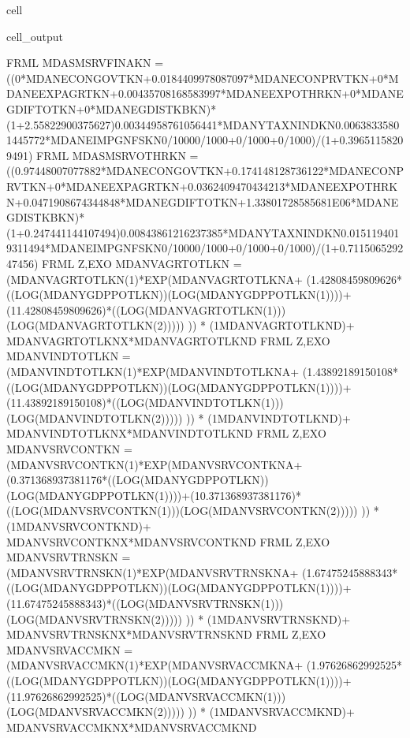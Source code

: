 \documentclass[letterpaper,10pt,english]{jupyterBook}
\begin{document}
\begin{sphinxuseclass}{cell}
\begin{sphinxVerbatimOutput}
\begin{sphinxuseclass}{cell_output}
\begin{sphinxVerbatim}[commandchars=\\\{\}]
FRML  \PYGZlt{}\PYGZgt{} MDASMSRVFINAKN = ((0*MDANECONGOVTKN+0.0184409978087097*MDANECONPRVTKN+0*MDANEEXPAGRTKN+0.00435708168583997*MDANEEXPOTHRKN+0*MDANEGDIFTOTKN+0*MDANEGDISTKBKN)*(1+2.55822900375627)\PYGZhy{}0.00344958761056441*MDANYTAXNINDKN\PYGZhy{}0.00638335801445772*MDANEIMPGNFSKN\PYGZhy{}0/1000\PYGZhy{}0/1000+0/1000+0/1000)/(1+0.39651158209491) \PYGZdl{}
FRML  \PYGZlt{}\PYGZgt{} MDASMSRVOTHRKN = ((0.97448007077882*MDANECONGOVTKN+0.174148128736122*MDANECONPRVTKN+0*MDANEEXPAGRTKN+0.0362409470434213*MDANEEXPOTHRKN+0.0471908674344848*MDANEGDIFTOTKN+1.33801728585681E\PYGZhy{}06*MDANEGDISTKBKN)*(1+0.247441144107494)\PYGZhy{}0.00843861216237385*MDANYTAXNINDKN\PYGZhy{}0.0151194019311494*MDANEIMPGNFSKN\PYGZhy{}0/1000\PYGZhy{}0/1000+0/1000+0/1000)/(1+0.711506529247456) \PYGZdl{}
FRML \PYGZlt{}Z,EXO\PYGZgt{} MDANVAGRTOTLKN = (MDANVAGRTOTLKN(\PYGZhy{}1)*EXP(MDANVAGRTOTLKN\PYGZus{}A+ (1.42808459809626*((LOG(MDANYGDPPOTLKN))\PYGZhy{}(LOG(MDANYGDPPOTLKN(\PYGZhy{}1))))+(1\PYGZhy{}1.42808459809626)*((LOG(MDANVAGRTOTLKN(\PYGZhy{}1)))\PYGZhy{}(LOG(MDANVAGRTOTLKN(\PYGZhy{}2))))) )) * (1\PYGZhy{}MDANVAGRTOTLKN\PYGZus{}D)+ MDANVAGRTOTLKN\PYGZus{}X*MDANVAGRTOTLKN\PYGZus{}D  \PYGZdl{}
FRML \PYGZlt{}Z,EXO\PYGZgt{} MDANVINDTOTLKN = (MDANVINDTOTLKN(\PYGZhy{}1)*EXP(MDANVINDTOTLKN\PYGZus{}A+ (1.43892189150108*((LOG(MDANYGDPPOTLKN))\PYGZhy{}(LOG(MDANYGDPPOTLKN(\PYGZhy{}1))))+(1\PYGZhy{}1.43892189150108)*((LOG(MDANVINDTOTLKN(\PYGZhy{}1)))\PYGZhy{}(LOG(MDANVINDTOTLKN(\PYGZhy{}2))))) )) * (1\PYGZhy{}MDANVINDTOTLKN\PYGZus{}D)+ MDANVINDTOTLKN\PYGZus{}X*MDANVINDTOTLKN\PYGZus{}D  \PYGZdl{}
FRML \PYGZlt{}Z,EXO\PYGZgt{} MDANVSRVCONTKN = (MDANVSRVCONTKN(\PYGZhy{}1)*EXP(MDANVSRVCONTKN\PYGZus{}A+ (0.371368937381176*((LOG(MDANYGDPPOTLKN))\PYGZhy{}(LOG(MDANYGDPPOTLKN(\PYGZhy{}1))))+(1\PYGZhy{}0.371368937381176)*((LOG(MDANVSRVCONTKN(\PYGZhy{}1)))\PYGZhy{}(LOG(MDANVSRVCONTKN(\PYGZhy{}2))))) )) * (1\PYGZhy{}MDANVSRVCONTKN\PYGZus{}D)+ MDANVSRVCONTKN\PYGZus{}X*MDANVSRVCONTKN\PYGZus{}D  \PYGZdl{}
FRML \PYGZlt{}Z,EXO\PYGZgt{} MDANVSRVTRNSKN = (MDANVSRVTRNSKN(\PYGZhy{}1)*EXP(MDANVSRVTRNSKN\PYGZus{}A+ (1.67475245888343*((LOG(MDANYGDPPOTLKN))\PYGZhy{}(LOG(MDANYGDPPOTLKN(\PYGZhy{}1))))+(1\PYGZhy{}1.67475245888343)*((LOG(MDANVSRVTRNSKN(\PYGZhy{}1)))\PYGZhy{}(LOG(MDANVSRVTRNSKN(\PYGZhy{}2))))) )) * (1\PYGZhy{}MDANVSRVTRNSKN\PYGZus{}D)+ MDANVSRVTRNSKN\PYGZus{}X*MDANVSRVTRNSKN\PYGZus{}D  \PYGZdl{}
FRML \PYGZlt{}Z,EXO\PYGZgt{} MDANVSRVACCMKN = (MDANVSRVACCMKN(\PYGZhy{}1)*EXP(MDANVSRVACCMKN\PYGZus{}A+ (1.97626862992525*((LOG(MDANYGDPPOTLKN))\PYGZhy{}(LOG(MDANYGDPPOTLKN(\PYGZhy{}1))))+(1\PYGZhy{}1.97626862992525)*((LOG(MDANVSRVACCMKN(\PYGZhy{}1)))\PYGZhy{}(LOG(MDANVSRVACCMKN(\PYGZhy{}2))))) )) * (1\PYGZhy{}MDANVSRVACCMKN\PYGZus{}D)+ MDANVSRVACCMKN\PYGZus{}X*MDANVSRVACCMKN\PYGZus{}D  \PYGZdl{}

\end{sphinxVerbatim}
\end{sphinxuseclass}
\end{sphinxVerbatimOutput}
\end{sphinxuseclass}
\end{document}
